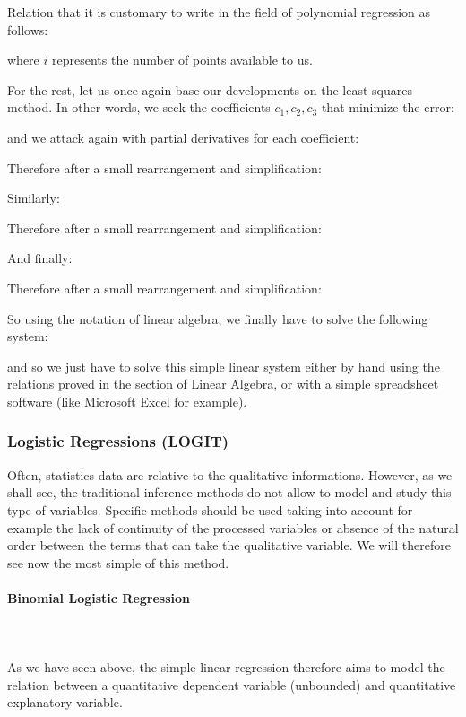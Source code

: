 	Relation that it is customary to write in the field of polynomial regression as follows:
	
	where $i$ represents the number of points available to us.
	
	For the rest, let us once again base our developments on the least squares method. In other words, we seek the coefficients $c_1,c_2,c_3$ that minimize the error:
	
	and we attack again with partial derivatives for each coefficient:
	
	Therefore after a small rearrangement and simplification:
	
	Similarly:
	
	Therefore after a small rearrangement and simplification:
	
	And finally:
	
	Therefore after a small rearrangement and simplification:
	
	So using the notation of linear algebra, we finally have to solve the following system:
	
	and so we just have to solve this simple linear system either by hand using the relations proved in the section of Linear Algebra, or with a simple spreadsheet software (like Microsoft Excel for example).
	
	\pagebreak
	\subsubsection{Logistic Regressions (LOGIT)}
	Often, statistics data are relative to the qualitative informations. However, as we shall see, the traditional inference methods do not allow to model and study this type of variables. Specific methods should be used taking into account for example the lack of continuity of the processed variables or absence of the natural order between the terms that can take the qualitative variable.  We will therefore see now the most simple of this method.
	
	\paragraph{Binomial Logistic Regression}\mbox{}\\\\
	As we have seen above, the simple linear regression therefore aims to model the relation between a quantitative dependent variable (unbounded) and quantitative explanatory variable.
	
